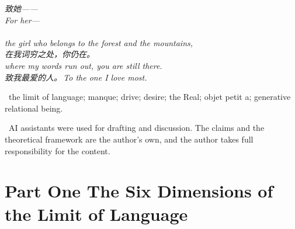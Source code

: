 
\thispagestyle{empty}
\null\vfill
\begin{center}
\begin{minipage}{0.74\linewidth}
\centering\itshape\color{rose}
{\cjk 致她——}\\[0.3em]
For her---\\[0.7em]
\\[0.2em]
the girl who belongs to the forest and the mountains,\\[0.5em]
{\cjk 在我词穷之处，你仍在。}\\[0.2em]
where my words run out, you are still there.\\[1.0em]
{\upshape\footnotesize\color{gold} {\cjk 致我最爱的人。}\,\;To the one I love most.}
\end{minipage}
\end{center}
\vfill\null
\clearpage



\vspace{1.2em}
\, \textcolor{inksoft}{the limit of language; manque; drive; desire; the Real; objet petit a; generative relational being.}

\vspace{1.0em}
\, \textcolor{inksoft}{AI assistants were used for drafting and discussion. The claims and the theoretical framework are the author's own, and the author takes full responsibility for the content.}
\newpage

\newpage

\part*{\textcolor{rosedeep}{Part One \quad The Six Dimensions of the Limit of Language}}


